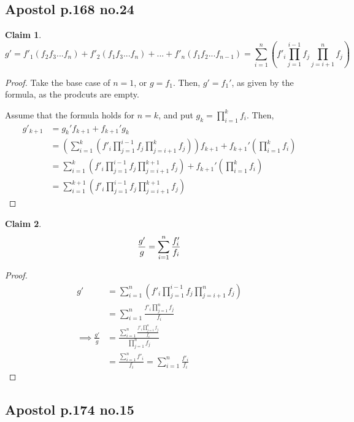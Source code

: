 \documentclass[12pt,letterpaper]{article}
\theoremstyle{definition}
\newtheorem*{claim}{Claim}
\begin{document}
\subsection*{Apostol p.168 no.24}

\begin{claim}
  \[
    g' = f'_1(f_2f_3...f_n) + f'_2(f_1f_3...f_n) + ... +
    f'_n(f_1f_2...f_{n-1}) = \sum_{i=1}^n (f'_i\prod_{j = 1}^{i-1} f_j \prod_{j=i+1}^nf_j)
  \]
\end{claim}

\begin{proof}
  Take the base case of $n = 1$, or $g = f_1$. Then,
  $g' = f_1'$, as given by the formula, as the prodcuts are empty.

  Assume that the formula holds for $n = k$, and put $g_k = \prod_{i=1}^kf_i$. Then,
  \begin{align*}
    g'_{k+1} &= g_k'f_{k+1} + f_{k+1}'g_k \\
             &= (\sum_{i=1}^k (f'_i\prod_{j = 1}^{i-1} f_j \prod_{j=i+1}^kf_j))f_{k+1} + f_{k+1}'(\prod_{i=1}^kf_i) \\
             &= \sum_{i=1}^k (f'_i\prod_{j = 1}^{i-1} f_j \prod_{j=i+1}^{k+1}f_j) + f_{k+1}'(\prod_{i=1}^kf_i) \\
             &= \sum_{i=1}^{k+1} (f'_i\prod_{j = 1}^{i-1} f_j \prod_{j=i+1}^{k+1}f_j)
  \end{align*}
\end{proof}

\begin{claim}
  \[
    \frac{g'}{g} = \sum_{i=1}^n\frac{f_i'}{f_i} \\
  \]
\end{claim}

\begin{proof}
  \begin{align*}
    g' &= \sum_{i=1}^n (f'_i\prod_{j = 1}^{i-1} f_j \prod_{j=i+1}^nf_j) \\
       &= \sum_{i=1}^n \frac{f'_i\prod_{j = 1}^{n} f_j}{f_i} \\
    \implies \frac{g'}{g} &= \frac{\sum_{i=1}^n \frac{f'_i\prod_{j = 1}^{n} f_j}{f_i}}{\prod_{j=1}^nf_j} \\
       &= \frac{\sum_{i=1}^nf'_i}{f_i} = \sum_{i=1}^n \frac{f'_i}{f_i}
  \end{align*}
\end{proof}

\subsection*{Apostol p.174 no.15}
\end{document}
